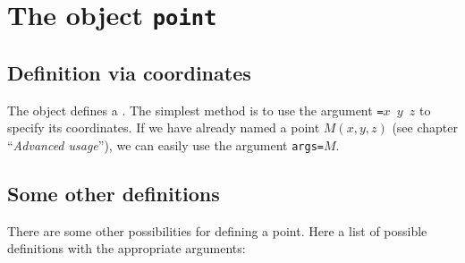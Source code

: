 \section{The object \texttt{point}}

\subsection{Definition via coordinates}

The object  defines a . The simplest method is to use the argument \texttt{=$x$ $y$ $z$} to specify its coordinates.
If we have already named a point $M(x, y, z)$ (see chapter ``\textit{Advanced usage\/}''), we can easily use the argument \texttt{args=$M$}.

\subsection{Some other definitions}

There are some other possibilities for defining a point. Here a list of possible definitions with the appropriate arguments:

